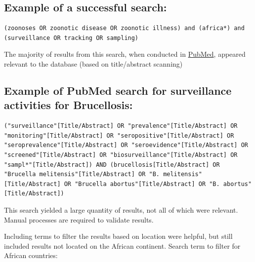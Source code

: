\documentclass[
]{book}
\begin{document}
\hypertarget{example-of-a-successful-search}{%
\subsection{Example of a successful search:}\label{example-of-a-successful-search}}

\begin{verbatim}
(zoonoses OR zoonotic disease OR zoonotic illness) and (africa*) and (surveillance OR tracking OR sampling)
\end{verbatim}

The majority of results from this search, when conducted in \href{https://pubmed.ncbi.nlm.nih.gov/}{PubMed}, appeared relevant to the database (based on title/abstract scanning)

\hypertarget{example-of-pubmed-search-for-surveillance-activities-for-brucellosis}{%
\subsection{Example of PubMed search for surveillance activities for Brucellosis:}\label{example-of-pubmed-search-for-surveillance-activities-for-brucellosis}}

\begin{verbatim}
("surveillance"[Title/Abstract] OR "prevalence"[Title/Abstract] OR "monitoring"[Title/Abstract] OR "seropositive"[Title/Abstract] OR "seroprevalence"[Title/Abstract] OR "seroevidence"[Title/Abstract] OR "screened"[Title/Abstract] OR "biosurveillance"[Title/Abstract] OR "sampl*"[Title/Abstract]) AND (brucellosis[Title/Abstract] OR "Brucella melitensis"[Title/Abstract] OR "B. melitensis"[Title/Abstract] OR "Brucella abortus"[Title/Abstract] OR "B. abortus"[Title/Abstract])  
\end{verbatim}

This search yielded a large quantity of results, not all of which were relevant. Manual processes are required to validate results.

Including terms to filter the results based on location were helpful, but still included results not located on the African continent. Search term to filter for African countries:
\end{document}
